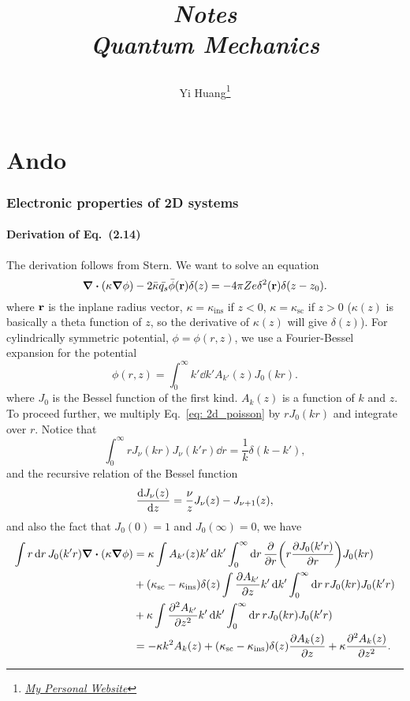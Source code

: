 \documentclass[10pt]{article}
\title{\begin{center}{\Huge \textit{Notes}}\\{{\itshape Quantum Mechanics}}\end{center}}
\author{Yi Huang\footnote{\href{https://yiihuang.com/}{\textit{My Personal Website}}}}
\affiliation{
University of Minnesota
}
\begin{document}
	\maketitle
	\flushbottom
	\newpage
	\pagestyle{fancynotes}
\part{Ando}
\section{Electronic properties of 2D systems}
\subsection{Derivation of Eq.~(2.14)}
The derivation follows from Stern\cite{PhysRev.163.816}. We want to solve an equation 
\begin{equation}
	\div(\kappa \grad{\phi}) - 2 \bar{\kappa} \bar{q_s} \bar{\phi}(\vb{r}) \delta(z) = - 4\pi Ze \delta^2(\vb{r}) \delta(z-z_0). \label{eq: 2d_poisson}
\end{equation}
where $\vb{r}$ is the inplane radius vector, $\kappa = \kappa_{\text{ins}}$ if $z<0$, $\kappa = \kappa_{\text{sc}}$ if $z>0$ ($\kappa(z)$ is basically a theta function of $z$, so the derivative of $\kappa(z)$ will give $\delta(z)$). For cylindrically symmetric potential, $\phi = \phi(r,z)$, we use a Fourier-Bessel expansion for the potential
\begin{equation}
	\phi(r, z) = \int_0^{\infty} k' \dd{k'} A_{k'}(z) J_0(kr).
\end{equation}
where $J_0$ is the Bessel function of the first kind. $A_k(z)$ is a function of $k$ and $z$. To proceed further, we multiply Eq.~\eqref{eq: 2d_poisson} by $r J_0(k r)$ and integrate over $r$. Notice that 
\begin{equation}
	\int_0^{\infty} r J_{\nu}(k r) J_{\nu}(k' r) \dd{r} = \frac{1}{k} \delta(k - k'),
\end{equation}
and the recursive relation of the Bessel function 
\begin{equation}
	\dv{J_{\nu}(z)}{z} = \frac{\nu}{z} J_{\nu}(z) - J_{\nu + 1}(z),
\end{equation}
and also the fact that $J_0(0) = 1$ and $J_0(\infty) = 0$, we have 
\begin{align*}
	\int r \dd{r} J_0(k' r) \div(\kappa \grad{\phi}) 
	&= \kappa \int A_{k'}(z) k' \dd{k'} \int_0^{\infty} \dd{r} \pdv{r} \qty(r \pdv{J_0(k' r)}{r}) J_0(k r) \\
	&+ (\kappa_{\text{sc}} - \kappa_{\text{ins}}) \delta(z) \int \pdv{A_{k'}}{z} k' \dd{k'} \int_0^{\infty} \dd{r} r J_0(k r) J_0(k' r) \\
	&+ \kappa \int \pdv[2]{A_{k'}}{z} k' \dd{k'} \int_0^{\infty} \dd{r} r J_0(k r) J_0(k' r) \\
	&= - \kappa k^2 A_k(z) + (\kappa_{\text{sc}} - \kappa_{\text{ins}}) \delta(z) \pdv{A_k(z)}{z} + \kappa \pdv[2]{A_k(z)}{z}.
\end{align*}
\end{document}
